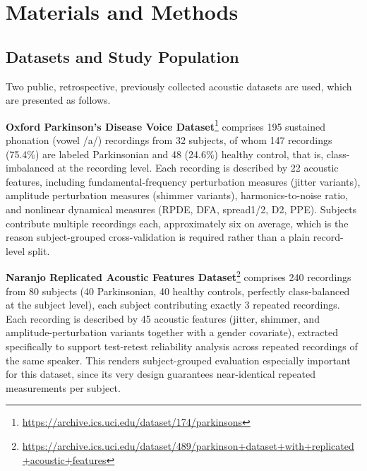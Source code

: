 \section{Materials and Methods} \label{sec:3}
\subsection{Datasets and Study Population} \label{sec:3.1}
Two public, retrospective, previously collected acoustic datasets are used, which are presented as follows.

\textbf{Oxford Parkinson's Disease Voice Dataset}\footnote{\url{https://archive.ics.uci.edu/dataset/174/parkinsons}} \cite{Little:2007} comprises 195 sustained phonation (vowel /a/) recordings from 32 subjects, of whom 147 recordings (75.4\%) are labeled Parkinsonian and 48 (24.6\%) healthy control, that is, class-imbalanced at the recording level. Each recording is described by 22 acoustic features, including fundamental-frequency perturbation measures (jitter variants), amplitude perturbation measures (shimmer variants), harmonics-to-noise ratio, and nonlinear dynamical measures (RPDE, DFA, spread1/2, D2, PPE). Subjects contribute multiple recordings each, approximately six on average, which is the reason subject-grouped cross-validation is required rather than a plain record-level split.

\textbf{Naranjo Replicated Acoustic Features Dataset}\footnote{\url{https://archive.ics.uci.edu/dataset/489/parkinson+dataset+with+replicated+acoustic+features}} \cite{Naranjo:2016} comprises 240 recordings from 80 subjects (40 Parkinsonian, 40 healthy controls, perfectly class-balanced at the subject level), each subject contributing exactly 3 repeated recordings. Each recording is described by 45 acoustic features (jitter, shimmer, and amplitude-perturbation variants together with a gender covariate), extracted specifically to support test-retest reliability analysis across repeated recordings of the same speaker. This renders subject-grouped evaluation especially important for this dataset, since its very design guarantees near-identical repeated measurements per subject.

